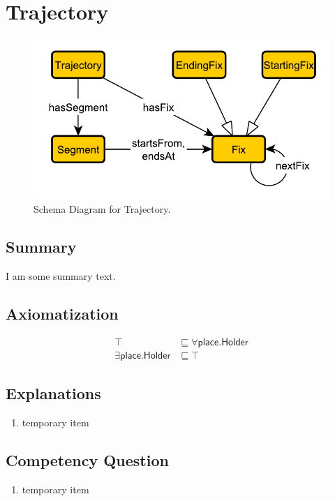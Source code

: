 \section{Trajectory}
\label{sec:Trajectory}
\begin{figure}[h!]
\begin{center}
\includegraphics[width=.8\textwidth]{figures/trajectory}
\end{center}
\caption{Schema Diagram for Trajectory.}
\label{fig:Trajectory}
\end{figure}
\subsection{Summary}
\label{sum:Trajectory}
I am some summary text.

\subsection{Axiomatization}
\label{axs:Trajectory}
\begin{align}
\top &\sqsubseteq \forall\textsf{place.Holder} \\ 
\exists\textsf{place.Holder} &\sqsubseteq \top 
\end{align}

\subsection{Explanations}
\label{exp:Trajectory}
\begin{enumerate}
\item temporary item
\end{enumerate}

\subsection{Competency Question}
\label{cqs:Trajectory}
\begin{enumerate}[CQ1.]
\item temporary item
\end{enumerate}

\newpage
